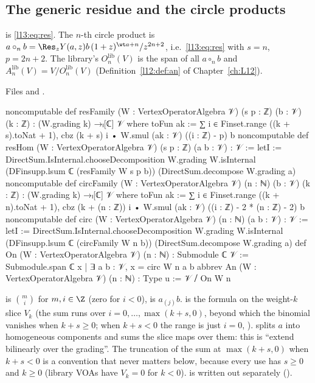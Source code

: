 \subsection{The generic residue and the circle products}

\begin{definition}\label{l13:def:circ}
 is \eqref{l13:eq:res}. The $n$-th circle product is $a\circ_nb = \Res_zY(a,z)b\,(1+z)^{\wt a+n}/z^{2n+2}$,
i.e.\ \eqref{l13:eq:res} with $s = n$, $p = 2n+2$. The library's $O_n^{\mathrm{lib}}(V)$ is the span of all $a\circ_nb$ and
$A_n^{\mathrm{lib}}(V) = V/O_n^{\mathrm{lib}}(V)$ (Definition~\ref{l12:def:an} of Chapter~\ref{ch:L12}).
\end{definition}
\noindent Files  and
.
\begin{leancode}
noncomputable def resFamily (W : VertexOperatorAlgebra 𝒱) (s p : ℤ) (b : 𝒱) (k : ℤ) :
    (W.grading k) →ₗ[ℂ] 𝒱 where
  toFun ak := ∑ i ∈ Finset.range ((k + s).toNat + 1),
    cbz (k + s) i • W.smul (ak : 𝒱) ((i : ℤ) - p) b
noncomputable def resHom (W : VertexOperatorAlgebra 𝒱) (s p : ℤ) (a b : 𝒱) : 𝒱 :=
  letI := DirectSum.IsInternal.chooseDecomposition W.grading W.isInternal
  (DFinsupp.lsum ℂ (resFamily W s p b)) (DirectSum.decompose W.grading a)
noncomputable def circFamily (W : VertexOperatorAlgebra 𝒱) (n : ℕ) (b : 𝒱) (k : ℤ) :
    (W.grading k) →ₗ[ℂ] 𝒱 where
  toFun ak := ∑ i ∈ Finset.range ((k + n).toNat + 1),
    cbz (k + (n : ℤ)) i • W.smul (ak : 𝒱) ((i : ℤ) - 2 * (n : ℤ) - 2) b
noncomputable def circ (W : VertexOperatorAlgebra 𝒱) (n : ℕ) (a b : 𝒱) : 𝒱 :=
  letI := DirectSum.IsInternal.chooseDecomposition W.grading W.isInternal
  (DFinsupp.lsum ℂ (circFamily W n b)) (DirectSum.decompose W.grading a)
def On (W : VertexOperatorAlgebra 𝒱) (n : ℕ) : Submodule ℂ 𝒱 :=
  Submodule.span ℂ {x | ∃ a b : 𝒱, x = circ W n a b}
abbrev An (W : VertexOperatorAlgebra 𝒱) (n : ℕ) : Type u := 𝒱 ⧸ On W n
\end{leancode}

\begin{dictionary}
 is $\binom mi$ for $m,i\in\Z$ (zero for $i<0$),  is $a_{(j)}b$. 
is the formula on the weight-$k$ slice $V_k$ (the sum runs over $i = 0,\dots,\max(k+s,0)$, beyond which the binomial
vanishes when $k+s\ge0$; when $k+s<0$ the range is just $i=0$, ). 
splits $a$ into homogeneous components and  sums the slice maps over them: this is ``extend bilinearly over
the grading''. The truncation of the sum at $\max(k+s,0)$ when $k+s<0$ is a convention that never matters below, because
every use has $s\ge0$ and $k\ge0$ (library VOAs have $V_k = 0$ for $k<0$).  is  written
out separately ().
\end{dictionary}

